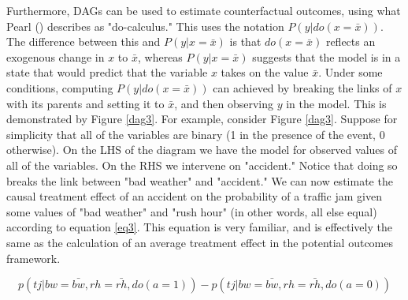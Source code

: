 \documentclass{article}
\begin{document}
Furthermore, DAGs can be used to estimate counterfactual outcomes, using what Pearl (\citeyear{pearl2014probabilistic}) describes as "do-calculus." This uses the notation $P(y|do(x=\bar{x}))$. The difference between this and $P(y|x=\bar{x})$ is that $do(x=\bar{x})$ reflects an exogenous change in $x$ to $\bar{x}$, whereas $P(y|x=\bar{x})$ suggests that the model is in a state that would predict that the variable $x$ takes on the value $\bar{x}$. Under some conditions, computing $P(y|do(x=\bar{x}))$ can achieved by breaking the links of $x$ with its parents and setting it to $\bar{x}$, and then observing $y$ in the model. This is demonstrated by Figure \ref{dag3}. For example, consider Figure \ref{dag3}. Suppose for simplicity that all of the variables are binary (1 in the presence of the event, 0 otherwise). On the LHS of the diagram we have the model for observed values of all of the variables. On the RHS we intervene on "accident." Notice that doing so breaks the link between "bad weather" and "accident." We can now estimate the causal treatment effect of an accident on the probability of a traffic jam given some values of "bad weather" and "rush hour" (in other words, all else equal) according to equation \ref{eq3}. This equation is very familiar, and is effectively the same as the calculation of an average treatment effect in the potential outcomes framework.

\begin{equation}
  \label{eq3}
  p(tj | bw = \bar{bw}, rh = \bar{rh}, do(a=1)) - p(tj | bw = \bar{bw}, rh = \bar{rh}, do(a=0))
\end{equation}
\end{document}
